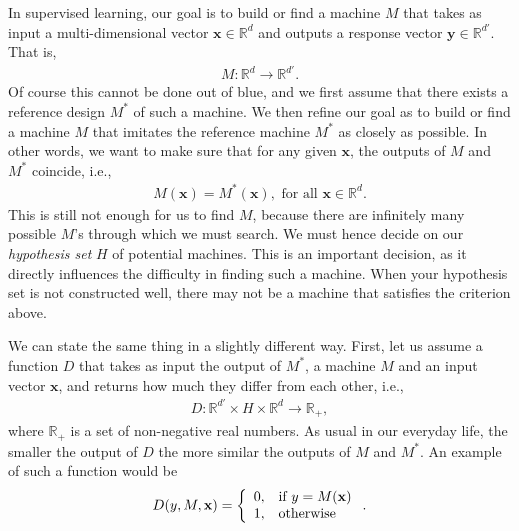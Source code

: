 \documentclass{report}
\newcommand{\vect}[1]{\mathbf{#1}}
\newcommand{\vx}[0]{\vect{x}}
\newcommand{\vy}[0]{\vect{y}}
\begin{document}
In supervised learning, our goal is to build or find a machine $M$ that takes as
input a multi-dimensional vector $\vx \in \mathbb{R}^d$ and outputs a response
vector $\vy \in \mathbb{R}^{d'}$.  That is,
\begin{align*}
    M: \mathbb{R}^d \to \mathbb{R}^{d'}.
\end{align*}
Of course this cannot be done out of blue, and we first assume that there exists
a reference design $M^*$ of such a machine.  We then refine our goal as to build
or find a machine $M$ that imitates the reference machine $M^*$ as closely as
possible. In other words, we want to make sure that for any given $\vx$, the
outputs of $M$ and $M^*$ coincide, i.e.,
\begin{align}
    \label{eq:classification0}
    M(\vx) = M^*(\vx),\text{ for all } \vx \in \mathbb{R}^d.
\end{align}
This is still not enough for us to find $M$, because there are infinitely many
possible $M$'s through which we must search. We must hence decide on our {\it
hypothesis set} $H$ of potential machines. This is an important decision, as it
directly influences the difficulty in finding such a machine. When your
hypothesis set is not constructed well, there may not be a machine that
satisfies the criterion above. 

We can state the same thing in a slightly different way. First, let us assume a
function $D$ that takes as input the output of $M^*$, a machine $M$ and an input
vector $\vx$, and returns how much they differ from each other, i.e.,
\begin{align*}
    D: \mathbb{R}^{d'} \times H \times \mathbb{R}^{d} \to \mathbb{R}_+,
\end{align*}
where $\mathbb{R}_+$ is a set of non-negative real numbers. As usual in our
everyday life, the smaller the output of $D$ the more similar the outputs of $M$
and $M^*$. An example of such a function would be
\begin{align*}
    D(y, M, \vx) = \left\{
        \begin{array}{l l}
            0, & \text{if }  y = M(\vx) \\
            1, & \text{otherwise}
        \end{array}
        \right..
\end{align*}
\end{document}
